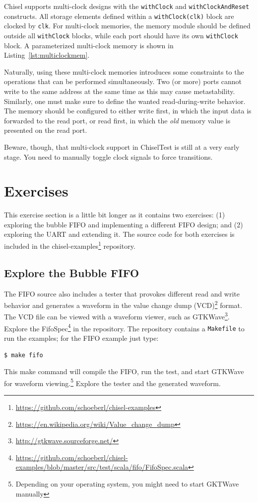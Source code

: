 \documentclass[%
    10pt,
    headinclude, footinclude=false,
    openright, %
    notitlepage,
    cleardoublepage=empty,
    headsepline,
    numbers=noenddot,
    bibliography=totoc, index=totoc,
    ]{scrbook}
\newcommand{\code}[1]{{\lstinline[basicstyle=\small\ttfamily]{#1}}}
\newcommand{\myref}[2]{\href{#1}{#2}}
\renewcommand{\myref}[2]{{#2}{\footnote{\url{#1}}}}
\begin{document}
Chisel supports multi-clock designs with the \code{withClock} and
\code{withClockAndReset} constructs. All storage elements defined within a
\code{withClock(clk)} block are clocked by \code{clk}. For multi-clock memories,
the memory module should be defined outside all \code{withClock} blocks, while
each port should have its own \code{withClock} block. A parameterized
multi-clock memory is shown in Listing~\ref{lst:multiclockmem}.


Naturally, using these multi-clock memories introduces some constraints to the
operations that can be performed simultaneously. Two (or more) ports cannot
write to the same address at the same time as this may cause metastability.
Similarly, one must make sure to define the wanted read-during-write behavior.
The memory should be configured to either write first, in which the input data is
forwarded to the read port, or read first, in which the \emph{old} memory value
is presented on the read port.

Beware, though, that multi-clock support in ChiselTest is still at a very early
stage. You need to manually toggle clock signals to force transitions.


\section{Exercises}

This exercise section is a little bit longer as it contains two exercises:
(1) exploring the bubble FIFO and implementing a different FIFO design;
and (2) exploring the UART and extending it.
The source code for both exercises is included in the
\myref{https://github.com/schoeberl/chisel-examples}{chisel-examples} repository.

\subsection{Explore the Bubble FIFO}

The FIFO source also includes a tester that provokes different read and write behavior and generates a waveform in the
\myref{https://en.wikipedia.org/wiki/Value_change_dump}{value change dump (VCD)} format.
The VCD file can be viewed with a waveform viewer, such as
\myref{http://gtkwave.sourceforge.net/}{GTKWave}.
Explore the
\myref{https://github.com/schoeberl/chisel-examples/blob/master/src/test/scala/fifo/FifoSpec.scala}{FifoSpec} in the repository.
The repository contains a \code{Makefile} to run the examples; for the FIFO example
just type:
\begin{verbatim}
$ make fifo
\end{verbatim}
This make command will compile the FIFO, run the test, and start GTKWave for waveform
viewing.\footnote{Depending on your operating system, you might need to start GKTWave
manually} Explore the tester and the generated waveform.
\end{document}
